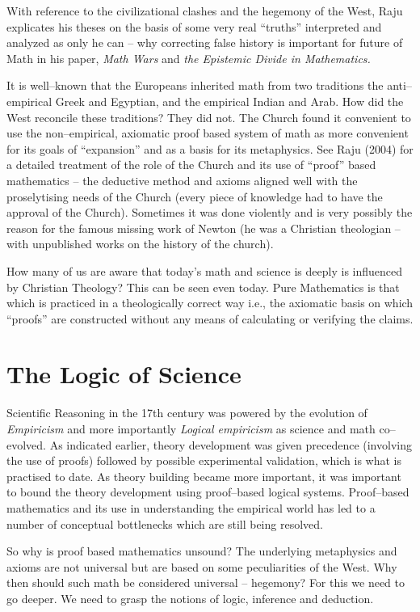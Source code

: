 With reference to the civilizational clashes and the hegemony of the West, Raju explicates his theses on the basis of some very real “truths” interpreted and analyzed as only he can – why correcting false history is important for future of Math in his paper, \textit{Math Wars} and \textit{the Epistemic Divide in Mathematics.}

It is well–known that the Europeans inherited math from two traditions the anti–empirical Greek and Egyptian, and the empirical Indian and Arab. How did the West reconcile these traditions? They did not. The Church found it convenient to use the non–empirical, axiomatic proof based system of math as more convenient for its goals of “expansion” and as a basis for its metaphysics. See Raju (2004) for a detailed treatment of the role of the Church and its use of “proof” based mathematics – the deductive method and axioms aligned well with the proselytising needs of the Church (every piece of knowledge had to have the approval of the Church). Sometimes it was done violently and is very possibly the reason for the famous missing work of Newton (he was a Christian theologian – with unpublished works on the history of the church).

How many of us are aware that today’s math and science is deeply is influenced by Christian Theology? This can be seen even today. Pure Mathematics is that which is practiced in a theologically correct way i.e., the axiomatic basis on which “proofs” are constructed without any means of calculating or verifying the claims.


\section*{The Logic of Science}

Scientific Reasoning in the 17th century was powered by the evolution of \textit{Empiricism} and more importantly \textit{Logical empiricism} as science and math co–evolved. As indicated earlier, theory development was given precedence (involving the use of proofs) followed by possible experimental validation, which is what is practised to date. As theory building became more important, it was important to bound the theory development using proof–based logical systems. Proof–based mathematics and its use in understanding the empirical world has led to a number of conceptual bottlenecks which are still being resolved.

So why is proof based mathematics unsound? The underlying metaphysics and axioms are not universal but are based on some peculiarities of the West. Why then should such math be considered universal – hegemony? For this we need to go deeper. We need to grasp the notions of logic, inference and deduction.

